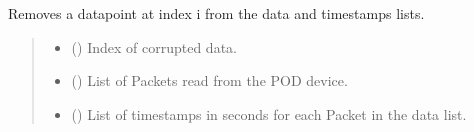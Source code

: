 \documentclass[letterpaper,10pt,english]{sphinxmanual}
\begin{document}
\begin{fulllineitems}
\begin{fulllineitems}
\begin{quote}
\begin{description}
\begin{itemize}
\end{itemize}

\end{description}\end{quote}

\end{fulllineitems}


\begin{fulllineitems}
\label{\detokenize{PodApi.Stream:PodApi.Stream.DataHose.Hose._Filter_RemoveEntry}}
\pysigstartsignatures
{}
\pysigstopsignatures
\sphinxAtStartPar
Removes a datapoint at index i from the data and timestamps lists.
\begin{quote}\begin{description}
\begin{itemize}
\item {} 
\sphinxAtStartPar
{} () \textendash{} Index of corrupted data.

\item {} 
\sphinxAtStartPar
{} (\sphinxstyleliteralemphasis{\sphinxupquote{{[}}}{\hyperref[\detokenize{PodApi.Packets:PodApi.Packets.Packet.Packet}]{\sphinxcrossref{\sphinxstyleliteralemphasis{\sphinxupquote{Packet}}}}}\sphinxstyleliteralemphasis{\sphinxupquote{ | }}\sphinxstyleliteralemphasis{\sphinxupquote{{]}}}) \textendash{} List of Packets read from the POD device.

\item {} 
\sphinxAtStartPar
{} (\sphinxstyleliteralemphasis{\sphinxupquote{{[}}}\sphinxstyleliteralemphasis{\sphinxupquote{{]}}}) \textendash{} List of timestamps in seconds for each Packet                 in the data list.


\end{itemize}
\end{description}
\end{quote}
\end{fulllineitems}
\end{fulllineitems}
\end{document}
